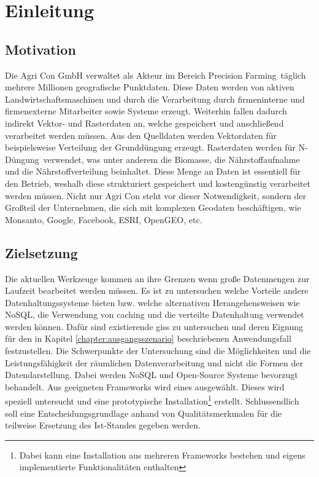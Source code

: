 \chapter{Einleitung}


\section{Motivation}

Die Agri Con GmbH verwaltet als Akteur im Bereich \glqq Precision Farming\grqq\ täglich mehrere Millionen geografische Punktdaten. Diese Daten werden von aktiven Landwirtschaftsmaschinen und durch die Verarbeitung durch firmeninterne und firmenexterne Mitarbeiter sowie Systeme erzeugt. Weiterhin fallen dadurch indirekt Vektor- und Rasterdaten an, welche gespeichert und anschließend verarbeitet werden müssen.
Aus den Quelldaten werden Vektordaten für beispielsweise Verteilung der Grunddüngung erzeugt. Rasterdaten werden für \glqq N-Düngung\grqq\  verwendet, was unter anderem die Biomasse, die Nährstoffaufnahme und die Nährstoffverteilung beinhaltet.
Diese Menge an Daten ist essentiell für den Betrieb, weshalb diese strukturiert gespeichert und kostengünstig verarbeitet werden müssen. Nicht nur Agri Con steht vor dieser Notwendigkeit, sondern der Großteil der Unternehmen, die sich mit komplexen Geodaten beschäftigen, wie Monsanto, Google, Facebook, ESRI, OpenGEO, etc.




\section{Zielsetzung}

Die aktuellen Werkzeuge kommen an ihre Grenzen wenn große Datenmengen zur Laufzeit bearbeitet werden müssen. Es ist zu untersuchen welche Vorteile andere Datenhaltungssysteme bieten bzw. welche alternativen Herangehensweisen wie NoSQL, die Verwendung von caching und die verteilte Datenhaltung verwendet werden können.
Dafür sind existierende \Glspl{gis} zu untersuchen und deren Eignung für den in Kapitel \ref{chapter:ausgangsszenario} beschriebenen Anwendungsfall festzustellen. Die Schwerpunkte der Untersuchung sind die Möglichkeiten und die Leistungsfähigkeit der räumlichen Datenverarbeitung und nicht die Formen der Datendarstellung.
Dabei werden NoSQL und Open-Source Systeme bevorzugt behandelt.
Aus geeigneten Frameworks wird eines ausgewählt. Dieses wird speziell untersucht und eine prototypische Installation\footnote{Dabei kann eine Installation aus mehreren Frameworks bestehen und eigens implementierte Funktionalitäten enthalten} erstellt.
Schlussendlich soll eine Entscheidungsgrundlage anhand von Qualitätsmerkmalen für die teilweise Ersetzung des Ist-Standes gegeben werden.

